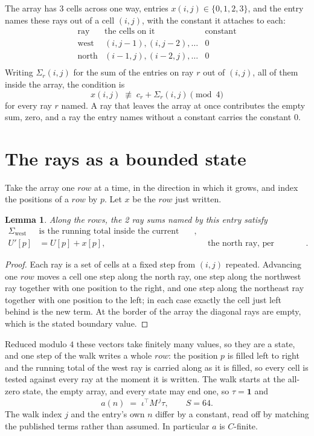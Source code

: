 \documentclass[11pt,a4paper]{article}
\theoremstyle{plain}
\newtheorem{lemma}[theorem]{Lemma}
\theoremstyle{definition}
\begin{document}
The array has $3$ cells across one way, entries $x(i,j)\in\{0,1,2,3\}$, and the entry names these
rays out of a cell $(i,j)$, with the constant it attaches to each:
\[
\begin{array}{lll}
\text{ray} & \text{the cells on it} & \text{constant} \\[2pt]
\text{west} & (i,j-1),(i,j-2),\dots & 0 \\
\text{north} & (i-1,j),(i-2,j),\dots & 0 \\
\end{array}
\]
Writing $\Sigma_r(i,j)$ for the sum of the entries on ray $r$ out of $(i,j)$, all of them
inside the array, the condition is
\[
x(i,j)\;\not\equiv\;c_r+\Sigma_r(i,j) \pmod{4}
\]
for every ray $r$ named. A ray that leaves the array at once contributes the empty sum,
zero, and a ray the entry names without a constant carries the constant $0$.

\section{The rays as a bounded state}

Take the array one $row$ at a time, in the direction in which it grows, and index the
positions of a $row $ by $p$. Let $x$ be the $row$ just written.

\begin{lemma}\label{lem:rays}
Along the $row$s, the 2 ray sums named by this entry satisfy
\[
\begin{aligned}
\Sigma_{\mathrm{west}}\ &\text{is the running total inside the current row},\\
U'[p]&=U[p]+x[p], &&\text{the north ray, per position} .
\end{aligned}
\]
\end{lemma}

\begin{proof}
Each ray is a set of cells at a fixed step from $(i,j)$ repeated. Advancing one $row$
moves a cell one step along the north ray, one step along the northwest ray together with one
position to the right, and one step along the northeast ray together with one position to the
left; in each case exactly the cell just left behind is the new term. At the border of the
array the diagonal rays are empty, which is the stated boundary value.
\end{proof}

Reduced modulo $4$ these vectors take finitely many values, so they are a state, and one step
of the walk writes a whole $row$: the position $p$ is filled left to right and the
running total of the west ray is carried along as it is filled, so every cell is tested
against every ray at the moment it is written. The walk starts at the all-zero state, the empty
array, and every state may end one, so $\tau=\mathbf{1}$ and
\[
a(n)\;=\;\iota^{\!\top}M^{\,j}\tau ,\qquad S=64.
\]
The walk index $j$ and the entry's own $n$ differ by a constant, read off by matching the
published terms rather than assumed. In particular $a$ is $C$-finite.
\end{document}
